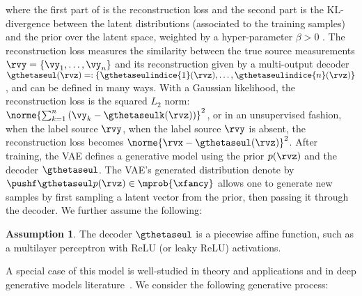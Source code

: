 \documentclass{article} %
\theoremstyle{plain}
\theoremstyle{definition}
\newtheorem{assumption}[theorem]{Assumption}
\theoremstyle{remark}
\numberwithin{equation}{section}
\begin{document}
where the first part of  is the reconstruction loss and the second part is the KL-divergence between the latent distributions (associated to the training samples) and the prior over the latent space, weighted by a hyper-parameter $\beta > 0$ \citep{higgins_beta-vae_2016}. 
The reconstruction loss measures the similarity between the true source measurements $\rvy = \{\vy_1, \dots, \vy_n\}$ and its reconstruction given by a multi-output decoder $\gthetaseul(\rvz)=:\{\gthetaseulindice{1}(\rvz),\dots, \gthetaseulindice{n}(\rvz)\}$, and can be defined in many ways.  With a Gaussian likelihood, the reconstruction loss is the squared $L_{2}$ norm: $\norme{\sum_{k=1}^{n} \left(\vy_k - \gthetaseulk(\rvz)\right)}^2$, or in an unsupervised fashion, when the label source $\rvy$, \ie when the label source $\rvy$ is absent, the reconstruction loss becomes $\norme{\rvx - \gthetaseul(\rvz)}^2$. After training, the VAE defines a generative model using the prior $p(\rvz)$ and the decoder $\gthetaseul$. The VAE's generated distribution denote by $\pushf\gthetaseul p(\rvz) \in \mprob{\xfancy}$ allows one to generate new samples by first sampling a latent vector from the prior, then passing it through the decoder. We further assume the following:
\begin{assumption}\label{assump:injective_piecewise}
The decoder $\gthetaseul$ is a piecewise affine function, such as a multilayer perceptron with ReLU (or leaky ReLU) activations. 
\end{assumption}
A special case of this model is well-studied in theory and applications and in deep generative models literature~\citep{3dshapes18, ahuja2022sparse}. We consider the following generative process:
\vspace{-0.3cm}
\end{document}
